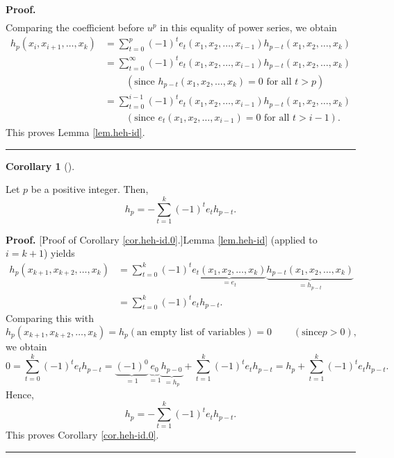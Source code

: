 \documentclass[numbers=enddot,12pt,final,onecolumn,notitlepage]{scrartcl}%
\theoremstyle{definition}
\newtheorem{coro}[theo]{Corollary}
\newenvironment{corollary}[1][]
{\begin{coro}[#1]\begin{leftbar}}
{\end{leftbar}\end{coro}}
\newenvironment{proof}[1][Proof]{\noindent\textbf{#1.} }{\ \rule{0.5em}{0.5em}}
\let\sumnonlimits\sum
\renewcommand{\sum}{\sumnonlimits\limits}
\begin{document}
\begin{proof}
\begin{align*}
\end{align*}
Comparing the coefficient before $u^{p}$ in this equality of power series, we
obtain%
\begin{align*}
h_{p}\left(  x_{i},x_{i+1},\ldots,x_{k}\right)   &  =\sum_{t=0}^{p}\left(
-1\right)  ^{t}e_{t}\left(  x_{1},x_{2},\ldots,x_{i-1}\right)  h_{p-t}\left(
x_{1},x_{2},\ldots,x_{k}\right) \\
&  =\sum_{t=0}^{\infty}\left(  -1\right)  ^{t}e_{t}\left(  x_{1},x_{2}%
,\ldots,x_{i-1}\right)  h_{p-t}\left(  x_{1},x_{2},\ldots,x_{k}\right) \\
&  \ \ \ \ \ \ \ \ \ \ \left(  \text{since }h_{p-t}\left(  x_{1},x_{2}%
,\ldots,x_{k}\right)  =0\text{ for all }t>p\right) \\
&  =\sum_{t=0}^{i-1}\left(  -1\right)  ^{t}e_{t}\left(  x_{1},x_{2}%
,\ldots,x_{i-1}\right)  h_{p-t}\left(  x_{1},x_{2},\ldots,x_{k}\right) \\
&  \ \ \ \ \ \ \ \ \ \ \left(  \text{since }e_{t}\left(  x_{1},x_{2}%
,\ldots,x_{i-1}\right)  =0\text{ for all }t>i-1\right)  .
\end{align*}
This proves Lemma \ref{lem.heh-id}.
\end{proof}

\begin{corollary}
\label{cor.heh-id.0}Let $p$ be a positive integer. Then,%
\[
h_{p}=-\sum_{t=1}^{k}\left(  -1\right)  ^{t}e_{t}h_{p-t}.
\]

\end{corollary}

\begin{proof}
[Proof of Corollary \ref{cor.heh-id.0}.]Lemma \ref{lem.heh-id} (applied to
$i=k+1$) yields%
\begin{align*}
h_{p}\left(  x_{k+1},x_{k+2},\ldots,x_{k}\right)   &  =\sum_{t=0}^{k}\left(
-1\right)  ^{t}\underbrace{e_{t}\left(  x_{1},x_{2},\ldots,x_{k}\right)
}_{=e_{t}}\underbrace{h_{p-t}\left(  x_{1},x_{2},\ldots,x_{k}\right)
}_{=h_{p-t}}\\
&  =\sum_{t=0}^{k}\left(  -1\right)  ^{t}e_{t}h_{p-t}.
\end{align*}
Comparing this with%
\[
h_{p}\left(  x_{k+1},x_{k+2},\ldots,x_{k}\right)  =h_{p}\left(  \text{an empty
list of variables}\right)  =0\ \ \ \ \ \ \ \ \ \ \left(  \text{since
}p>0\right)  ,
\]
we obtain%
\[
0=\sum_{t=0}^{k}\left(  -1\right)  ^{t}e_{t}h_{p-t}=\underbrace{\left(
-1\right)  ^{0}}_{=1}\underbrace{e_{0}}_{=1}\underbrace{h_{p-0}}_{=h_{p}}%
+\sum_{t=1}^{k}\left(  -1\right)  ^{t}e_{t}h_{p-t}=h_{p}+\sum_{t=1}^{k}\left(
-1\right)  ^{t}e_{t}h_{p-t}.
\]
Hence,%
\[
h_{p}=-\sum_{t=1}^{k}\left(  -1\right)  ^{t}e_{t}h_{p-t}.
\]
This proves Corollary \ref{cor.heh-id.0}.
\end{proof}
\end{document}
